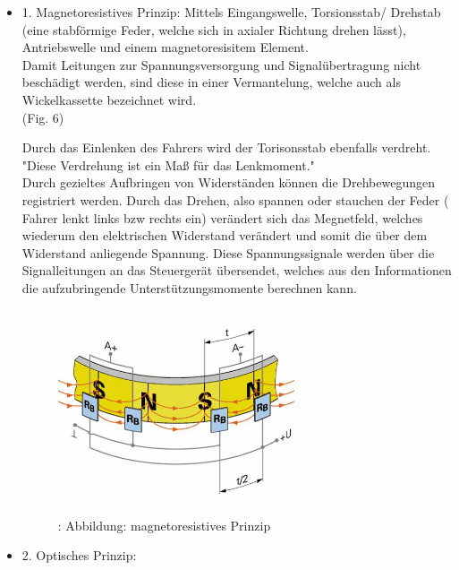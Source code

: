 				\begin{itemize}
					\item 1. Magnetoresistives Prinzip:
							 Mittels Eingangswelle, Torsionsstab/ Drehstab (eine stabförmige Feder, welche sich in axialer Richtung drehen lässt), Antriebswelle und einem magnetoresisitem Element. \\
							 Damit Leitungen zur Spannungsversorgung und Signalübertragung nicht beschädigt werden, sind diese in einer Vermantelung, welche auch als Wickelkassette bezeichnet wird.\\ (Fig. 6)
							 
							 Durch das Einlenken des Fahrers wird der Torisonsstab ebenfalls verdreht. "Diese Verdrehung ist ein Maß für das Lenkmoment."\cite{TS12}\\
							 Durch gezieltes Aufbringen von Widerständen können die Drehbewegungen registriert werden. Durch das Drehen, also spannen oder stauchen der Feder ( Fahrer lenkt links bzw rechts ein) verändert sich das Megnetfeld, welches wiederum den elektrischen Widerstand verändert und somit die über dem Widerstand anliegende Spannung. Diese Spannungssignale werden über die Signalleitungen an das Steuergerät übersendet, welches aus den Informationen die aufzubringende Unterstützungsmomente berechnen kann.				 

							\begin{figure}
								\centering
								\includegraphics[width=7cm, height=6cm] {lenkdrehmomentsensor.png}
								\caption {\cite{TS13}: Abbildung: magnetoresistives Prinzip}
							\end{figure}			 

	
					\item 2. Optisches Prinzip:


\end{itemize}
